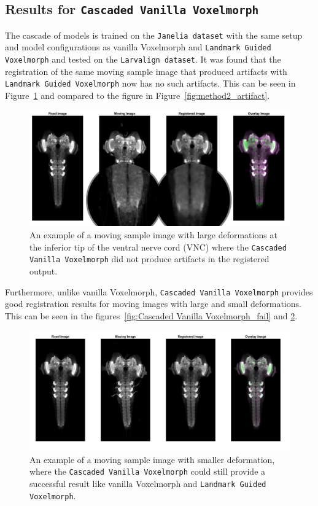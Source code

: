 \documentclass{book}
\begin{document}
	\subsection{Results for \texttt{Cascaded Vanilla Voxelmorph}}
	The cascade of models is trained on the \texttt{Janelia dataset} with the same setup and model configurations as vanilla Voxelmorph and \texttt{Landmark Guided Voxelmorph} and tested on the \texttt{Larvalign dataset}. It was found that the registration of the same moving sample image that produced artifacts with \texttt{Landmark Guided Voxelmorph} now has no such artifacts. This can be seen in Figure~\ref{fig:Cascaded Vanilla Voxelmorph_artifact} and compared to the figure in Figure~\ref{fig:method2_artifact}.
	
	\begin{figure}[h!]
		\centering
		\includegraphics[width=0.9\columnwidth]{resources/chapter4/Method3/compare/np_52B07_52H01_MB262B_021713B_scaled.png}
		\caption{An example of a moving sample image with large deformations at the inferior tip of the ventral nerve cord (VNC) where the \texttt{Cascaded Vanilla Voxelmorph} did not produce artifacts in the registered output.}
		\label{fig:Cascaded Vanilla Voxelmorph_artifact}
	\end{figure}
	
	Furthermore, unlike vanilla Voxelmorph, \texttt{Cascaded Vanilla Voxelmorph} provides good registration results for moving images with large and small deformations. This can be seen in the figures~\ref{fig:Cascaded Vanilla Voxelmorph_fail} and \ref{fig:Cascaded Vanilla Voxelmorph_pas}.
	
	\begin{figure}[h!]
		\centering
		\includegraphics[width=0.9\columnwidth]{resources/chapter4/Method3/compare/np_brain7_scaled.tif.png}
		\caption{An example of a moving sample image with smaller deformation, where the \texttt{Cascaded Vanilla Voxelmorph} could still provide a successful result like vanilla Voxelmorph and \texttt{Landmark Guided Voxelmorph}.}
		\label{fig:Cascaded Vanilla Voxelmorph_pas}
	\end{figure}
	
\end{document}
